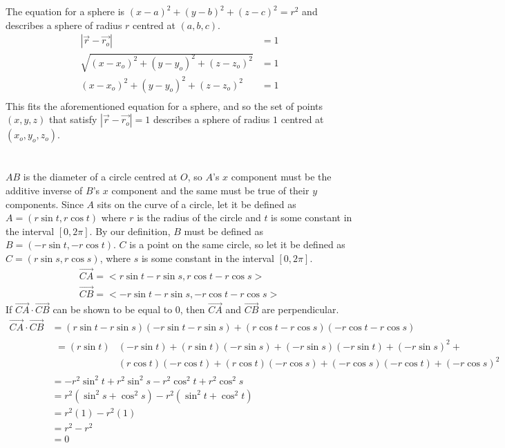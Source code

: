 \documentclass{article}
\begin{document}
\section{}
	The equation for a sphere is ${(x-a)}^2+{(y-b)}^2+{(z-c)}^2=r^2$ and describes a sphere of radius $r$
	centred at $(a,b,c)$.
	\begin{align*}
		|\vec{r}-\vec{r_o}|&=1\\
		\sqrt{{(x-x_o)}^2+{(y-y_o)}^2+{(z-z_o)}^2}&=1\\
		{(x-x_o)}^2+{(y-y_o)}^2+{(z-z_o)}^2&=1\\
	\end{align*}
	This fits the aforementioned equation for a sphere, and so the set of points $(x,y,z)$
	that satisfy $|\vec{r}-\vec{r_o}|=1$ describes a sphere of radius $1$ centred at $(x_o,y_o,z_o)$.
\section{}
	$AB$ is the diameter of a circle centred at $O$, so $A$'s $x$ component must be the additive inverse
	of $B$'s $x$ component and the same must be true of their $y$ components. Since $A$ sits on the curve of
	a circle, let it be defined as $A=(r\sin{t},r\cos{t})$ where $r$ is the radius of the circle and $t$ is
	some constant in the interval $[0,2\pi]$. By our definition, $B$ must be defined as $B=(-r\sin{t},-r\cos{t})$.
	$C$ is a point on the same circle, so let it be defined as $C=(r\sin{s},r\cos{s})$, where $s$ is some constant
	in the interval $[0,2\pi]$.
	\begin{align*}
		\vec{CA}=<r\sin{t}-r\sin{s},r\cos{t}-r\cos{s}>\\
		\vec{CB}=<-r\sin{t}-r\sin{s},-r\cos{t}-r\cos{s}>
	\end{align*}
	If $\vec{CA}\cdot{\vec{CB}}$ can be shown to be equal to $0$, then $\vec{CA}$ and $\vec{CB}$ are perpendicular.
	\begin{align*}
		\vec{CA}\cdot{\vec{CB}}&={(r\sin{t}-r\sin{s})}{(-r\sin{t}-r\sin{s})}+{(r\cos{t}-r\cos{s})}{(-r\cos{t}-r\cos{s})}\\
		&\begin{aligned}
			={(r\sin{t})}&{(-r\sin{t})}+{(r\sin{t})}{(-r\sin{s})}+{(-r\sin{s})}{(-r\sin{t})}+{(-r\sin{s})}^2+\\
		&{(r\cos{t})}{(-r\cos{t})}+{(r\cos{t})}{(-r\cos{s})}+{(-r\cos{s})}{(-r\cos{t})}+{(-r\cos{s})}^2
		\end{aligned}\\
		&=-r^2\sin^2{t}+r^2\sin^2{s}-r^2\cos^2{t}+r^2\cos^2{s}\\
		&=r^2{(\sin^2{s}+\cos^2{s})}-r^2{(\sin^2{t}+\cos^2{t})}\\
		&=r^2{(1)}-r^2{(1)}\\
		&=r^2-r^2\\
		&=0
	\end{align*}
\end{document}
